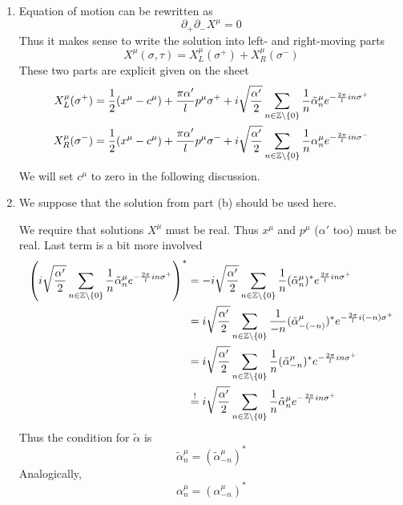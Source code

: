 \begin{enumerate}[label=(\alph*)]
	\item Equation of motion can be rewritten as
		\begin{equation*}
			\partial_+ \partial_- X^\mu = 0
		\end{equation*}
		Thus it makes sense to write the solution into left- and right-moving parts
		\begin{equation}
			X^\mu (\sigma, \tau) = X^\mu_L (\sigma^+) + X^\mu_R (\sigma^-)
		\end{equation}
		These two parts are explicit given on the sheet
		\begin{align}
			X_L^\mu (\sigma^+) &= \frac{1}{2} (x^\mu - c^\mu) + \frac{\pi \alpha'}{l} p^\mu \sigma^+ + i \sqrt{\frac{\alpha'}{2}} \sum_{n \in \mathbb{Z} \setminus \{0\}} \frac{1}{n} \tilde{\alpha}_n^\mu e^{-\frac{2\pi}{l} i n \sigma^+} \\
			X_R^\mu (\sigma^-) &= \frac{1}{2} (x^\mu - c^\mu) + \frac{\pi \alpha'}{l} p^\mu \sigma^- + i \sqrt{\frac{\alpha'}{2}} \sum_{n \in \mathbb{Z} \setminus \{0\}} \frac{1}{n} {\alpha}_n^\mu e^{-\frac{2\pi}{l} i n \sigma^-}
		\end{align}
		We will set $c^\mu$ to zero in the following discussion.

	\item  We suppose that the solution from part (b) should be used here.
	
		We require that solutions $X^\mu$ must be real. Thus $x^\mu$ and $p^\mu$ ($\alpha'$ too) must be real. Last term is a bit more involved
		\begin{align*}
			\left( i \sqrt{\frac{\alpha'}{2}} \sum_{n \in \mathbb{Z} \setminus \{0\}} \frac{1}{n} \tilde{\alpha}_n^\mu e^{-\frac{2\pi}{l} i n \sigma^+} \right)^* &= -i \sqrt{\frac{\alpha'}{2}} \sum_{n \in \mathbb{Z} \setminus \{0\}} \frac{1}{n} (\tilde{\alpha}_n^\mu)^* e^{\frac{2\pi}{l} i n \sigma^+} \\
																																																		 &= i \sqrt{\frac{\alpha'}{2}} \sum_{n \in \mathbb{Z} \setminus \{0\}} \frac{1}{-n} (\tilde\alpha_{-(-n)}^\mu)^* e^{-\frac{2\pi}{l}i (-n) \sigma^+} \\
																																																		 &= i \sqrt{\frac{\alpha'}{2}} \sum_{n \in \mathbb{Z} \setminus \{0\}} \frac{1}{n} (\tilde\alpha_{-n}^\mu)^* e^{-\frac{2\pi}{l}i n \sigma^+} \\
																																																		 &\stackrel{!}{=} i \sqrt{\frac{\alpha'}{2}} \sum_{n \in \mathbb{Z} \setminus \{0\}} \frac{1}{n} \tilde\alpha_{n}^\mu e^{-\frac{2\pi}{l}i n \sigma^+}
		\end{align*}
		Thus the condition for $\tilde\alpha$ is
		\begin{equation*}
			\tilde \alpha^\mu_n = (\tilde \alpha^\mu_{-n})^*
		\end{equation*}
		Analogically,
		\begin{equation*}
			 \alpha^\mu_n = ( \alpha^\mu_{-n})^*
		\end{equation*}
	

\end{enumerate}
